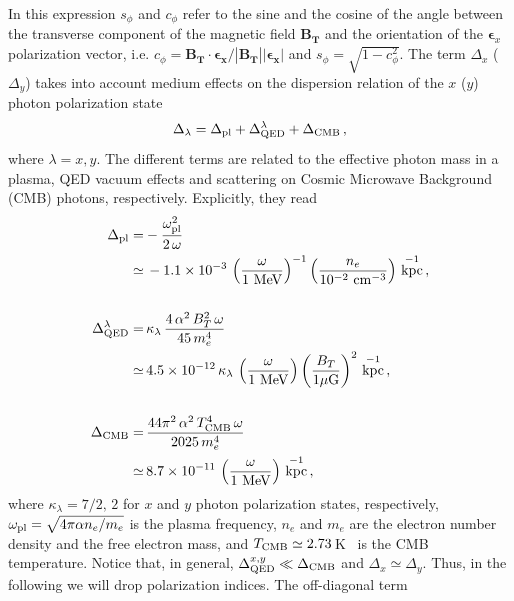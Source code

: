 \documentclass[twocolumn,superscriptaddress,floatfix,preprintnumbers, nofootinbib,hyperref]{revtex4-2}
\DeclareMathOperator{\cm}{cm}
\DeclareMathOperator{\MeV}{MeV}
\DeclareMathOperator{\kpc}{kpc}
\begin{document}
In this expression $s_\phi$ and $c_\phi$ refer to the sine and the cosine of the angle between the transverse component of the magnetic field $\mathbf{B_T}$ and the orientation of the $\bm{\epsilon}_x$ 
polarization vector, i.e. $c_\phi=\mathbf{B_T} \cdot \bm{\epsilon_x}/|\mathbf{B_T}||\bm{\epsilon_x}|$ and $s_\phi=\sqrt{1-c_\phi^2}$.
The term $\Delta_{x}$ ($\Delta_{y}$) takes into account medium effects on the dispersion relation of the $x$ ($y$) photon polarization state 
\begin{equation}
    \Delta_{\lambda}=\Delta_{\rm pl}+\Delta^{\lambda}_{\rm QED}+\Delta_{\rm CMB}\,,
\end{equation}
where $\lambda=x,y$. The different terms are related to the effective photon mass in a plasma, QED vacuum effects and scattering on Cosmic Microwave Background (CMB) photons, respectively. Explicitly, they read~\cite{Latorre:1994cv,Kong:1998ic,Dobrynina:2014qba}
\begin{equation}
    \begin{split}
        \Delta_{\rm pl}=&-\frac{\omega_{\rm pl}^2}{2\,\omega}\\
        \simeq&\,-1.1\times10^{-3}\,\left(\frac{\omega}{1\,\MeV}\right)^{-1}\left(\frac{n_e}{10^{-2}\,\cm^{-3}}\right)\,\kpc^{-1}\,,\\
        \\
        \Delta^{\lambda}_{\rm QED}=&\,\kappa_\lambda\,\frac{4\,\alpha^2 \,B_T^2\,\omega}{45\,m_e^4}\\
        \simeq&\,4.5\times10^{-12}\,\kappa_\lambda\,\left(\frac{\omega}{1\,\MeV}\right)\left(\frac{B_T}{1\mu{\rm G}}\right)^2\,\kpc^{-1}\,,\\
        \\
        \Delta_{\rm CMB}=&\,\frac{44\pi^2\,\alpha^2\,T_{\rm CMB}^4\,\omega}{2025\,m_e^4}\\
        \simeq&\,8.7\times10^{-11}\,\left(\frac{\omega}{1\,\MeV}\right)\,\kpc^{-1}\,,
    \end{split}
\end{equation}
where $\kappa_\lambda=7/2,\,2$ for $x$ and $y$ photon polarization states, respectively, $\omega_{\rm pl}=\sqrt{4\pi\alpha n_e/m_e}$ is the plasma frequency, $n_e$ and $m_e$ are the electron number density and the free electron mass, and $T_{\rm CMB}\simeq2.73\,$K~\cite{Fixsen:2009ug} is the CMB temperature.
Notice that, in general,  $\Delta^{x,y}_{\rm QED}\ll\Delta_{\rm CMB}$ and $\Delta_x\simeq\Delta_y$. Thus, in the following we will drop polarization indices. The off-diagonal term
\end{document}
